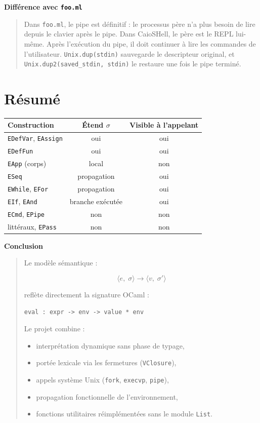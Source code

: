 \documentclass[11pt,a4paper]{article}
\newcommand{\sem}[4]{%
  \langle #1,\;#2\rangle \rightarrow \langle #3,\;#4\rangle}
\newenvironment{bloc}[1]
{
  \par\medskip
  \noindent\textbf{#1}
  \par
  \smallskip
  \begin{quote}
}
{
  \end{quote}
  \medskip
}
\begin{document}
\begin{bloc}{Différence avec \texttt{foo.ml}}
Dans \texttt{foo.ml}, le pipe est définitif : le processus père
n'a plus besoin de lire depuis le clavier après le pipe.
Dans CaioSHell, le père est le REPL lui-même.
Après l'exécution du pipe, il doit continuer à lire les commandes
de l'utilisateur.
\texttt{Unix.dup(stdin)} sauvegarde le descripteur original,
et \texttt{Unix.dup2(saved\_stdin, stdin)} le restaure
une fois le pipe terminé.
\end{bloc}

\section{Résumé}

\begin{center}
\begin{tabular}{|l|c|c|}
\hline
Construction & Étend $\sigma$ & Visible à l'appelant \\
\hline
\texttt{EDefVar}, \texttt{EAssign} & oui & oui \\
\texttt{EDefFun} & oui & oui \\
\texttt{EApp} (corps) & local & non \\
\texttt{ESeq} & propagation & oui \\
\texttt{EWhile}, \texttt{EFor} & propagation & oui \\
\texttt{EIf}, \texttt{EAnd} & branche exécutée & oui \\
\texttt{ECmd}, \texttt{EPipe} & non & non \\
littéraux, \texttt{EPass} & non & non \\
\hline
\end{tabular}
\end{center}

\begin{bloc}{Conclusion}
Le modèle sémantique :

\[
\sem{e}{\sigma}{v}{\sigma'}
\]

reflète directement la signature OCaml :

\begin{lstlisting}[language=ml]
eval : expr -> env -> value * env
\end{lstlisting}

Le projet combine :

\begin{itemize}
  \item interprétation dynamique sans phase de typage,
  \item portée lexicale via les fermetures (\texttt{VClosure}),
  \item appels système Unix (\texttt{fork}, \texttt{execvp}, \texttt{pipe}),
  \item propagation fonctionnelle de l'environnement,
  \item fonctions utilitaires réimplémentées sans le module \texttt{List}.
\end{itemize}
\end{bloc}
\end{document}
